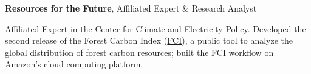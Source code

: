 \documentclass[10pt,letterpaper]{article}
\renewenvironment{itemize}{
  \begin{list}{}{
    \setlength{\leftmargin}{1.5em}
    \setlength{\itemsep}{0.25em}
    \setlength{\parskip}{0pt}
    \setlength{\parsep}{0.25em}
  }
}{
  \end{list}
}
\begin{document}
\begin{itemize}


\item \textbf{Resources for the Future}, Affiliated Expert \& Research Analyst %
  \begin{itemize}
  \item Affiliated Expert in the Center for Climate and Electricity Policy. Developed the second release of the Forest Carbon Index (\href{http://www.forestcarbonindex.org}{FCI}), a public tool to analyze the global distribution of forest carbon resources; built the FCI workflow on Amazon's cloud computing platform.
  \end{itemize}


\end{itemize}
\end{document}
